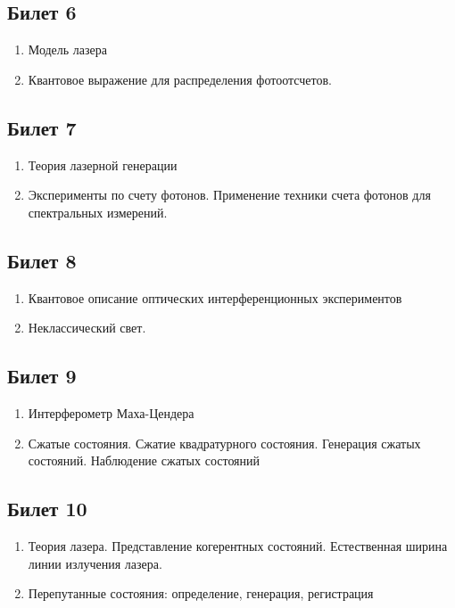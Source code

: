 \documentclass[12pt,a4paper]{article}
\begin{document}
\subsection*{Билет 6} 
\begin{enumerate}
\item Модель лазера
\item Квантовое выражение для распределения фотоотсчетов.
\end{enumerate}

\subsection*{Билет 7} 
\begin{enumerate}
\item Теория лазерной генерации
\item Эксперименты по счету фотонов. Применение техники счета
  фотонов для спектральных измерений.
\end{enumerate}

\subsection*{Билет 8} 
\begin{enumerate}
\item Квантовое описание оптических интерференционных экспериментов
\item Неклассический свет.
\end{enumerate}

\subsection*{Билет 9} 
\begin{enumerate}
\item Интерферометр Маха-Цендера
\item Сжатые состояния. Сжатие квадратурного состояния. Генерация
  сжатых состояний. Наблюдение сжатых состояний
\end{enumerate}

\subsection*{Билет 10} 
\begin{enumerate}
\item Теория лазера. Представление когерентных состояний. Естественная
  ширина линии излучения лазера.
\item Перепутанные состояния: определение, генерация, регистрация
\end{enumerate}
\end{document}
